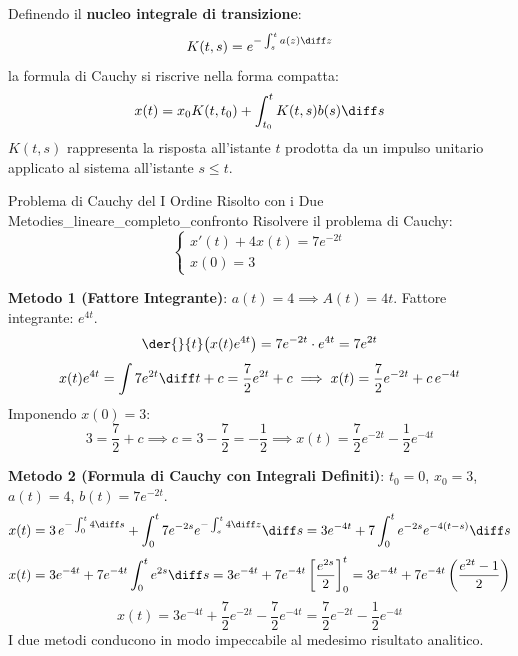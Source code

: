 \begin{osservazione}
Definendo il \textbf{nucleo integrale di transizione}:
\begin{equation}
    \label{eq:propagatore_green}
    K(t, s) = e^{-\int_s^t a(z) \diff z}
\end{equation}
la formula di Cauchy si riscrive nella forma compatta:
\[
    x(t) = x_0 K(t, t_0) + \int_{t_0}^t K(t, s) b(s) \diff s
\]
$K(t, s)$ rappresenta la risposta all'istante $t$ prodotta da un impulso unitario applicato al sistema all'istante $s \le t$.
\end{osservazione}

\begin{esempio}{Problema di Cauchy del I Ordine Risolto con i Due Metodi}{es_lineare_completo_confronto}
Risolvere il problema di Cauchy:
\[
    \begin{cases}
        x'(t) + 4 x(t) = 7 e^{-2t} \\
        x(0) = 3
    \end{cases}
\]

\textbf{Metodo 1 (Fattore Integrante)}:
$a(t) = 4 \implies A(t) = 4t$. Fattore integrante: $e^{4t}$.
\[
    \der{}{t}\big( x(t) e^{4t} \big) = 7 e^{-2t} \cdot e^{4t} = 7 e^{2t}
\]
\[
    x(t) e^{4t} = \int 7 e^{2t} \diff t + c = \frac{7}{2} e^{2t} + c \implies x(t) = \frac{7}{2} e^{-2t} + c\, e^{-4t}
\]
Imponendo $x(0) = 3$:
\[
    3 = \frac{7}{2} + c \implies c = 3 - \frac{7}{2} = -\frac{1}{2} \implies x(t) = \frac{7}{2} e^{-2t} - \frac{1}{2} e^{-4t}
\]

\textbf{Metodo 2 (Formula di Cauchy con Integrali Definiti)}:
$t_0 = 0$, $x_0 = 3$, $a(t) = 4$, $b(t) = 7e^{-2t}$.
\[
    x(t) = 3\, e^{-\int_0^t 4 \diff s} + \int_0^t 7 e^{-2s} e^{-\int_s^t 4 \diff z} \diff s = 3 e^{-4t} + 7 \int_0^t e^{-2s} e^{-4(t-s)} \diff s
\]
\[
    x(t) = 3 e^{-4t} + 7 e^{-4t} \int_0^t e^{2s} \diff s = 3 e^{-4t} + 7 e^{-4t} \left[ \frac{e^{2s}}{2} \right]_0^t = 3 e^{-4t} + 7 e^{-4t} \left( \frac{e^{2t}-1}{2} \right)
\]
\[
    x(t) = 3 e^{-4t} + \frac{7}{2} e^{-2t} - \frac{7}{2} e^{-4t} = \frac{7}{2} e^{-2t} - \frac{1}{2} e^{-4t}
\]
I due metodi conducono in modo impeccabile al medesimo risultato analitico.
\end{esempio}

\newpage


